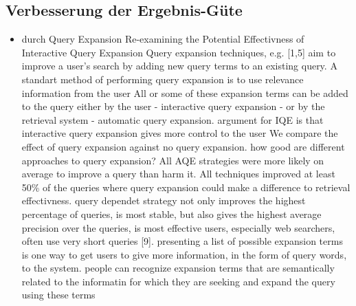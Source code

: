  \subsection{Verbesserung der Ergebnis-Güte}
	\begin{itemize}
		\item durch Query Expansion
		Re-examining the Potential Effectivness of Interactive Query Expansion
Query expansion techniques, e.g. [1,5] aim to improve a user's search by adding new query terms to an existing query. A standart method of performing query expansion is to use relevance information from the user
All or some of these expansion terms can be added to the query either by the user - interactive query expansion - or by the retrieval system - automatic query expansion.
argument for IQE is that interactive query expansion gives more control to the user
We compare the effect of query expansion against no query expansion. how good are different approaches to query expansion? 
All AQE strategies were more likely on average to improve a query than harm it. All techniques improved at least 50\% of the queries where query expansion could make a difference to retrieval effectivness.
query dependet strategy not only improves the highest percentage of queries, is most stable, but also gives the highest average precision over the queries, is most effective
users, especially web searchers, often use very short queries [9]. presenting a list of possible expansion terms is one way to get users to give more information, in the form of query words, to the system.
people can recognize expansion terms that are semantically related to the informatin for which they are seeking and expand the query using these terms


\end{itemize}
